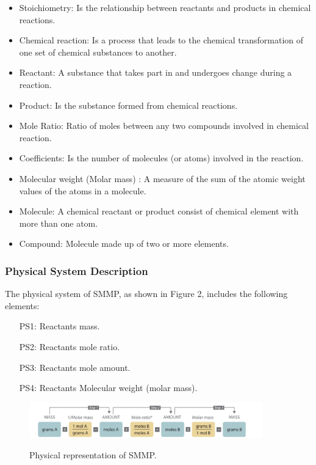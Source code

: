 \documentclass[12pt]{article}
\begin{document}
\begin{itemize}

\item Stoichiometry:  Is the relationship between reactants and products in chemical reactions.
\item Chemical reaction: Is a process that leads to the chemical transformation of one set of chemical substances to another.
\item Reactant: A substance that takes part in and undergoes change during a reaction.
\item Product:  Is the substance formed from chemical reactions.
\item Mole Ratio: Ratio of moles between any two compounds involved in chemical reaction.
\item Coefficients: Is the number of molecules (or atoms) involved in the reaction.
\item Molecular weight (Molar mass) :  A measure of the sum of the atomic weight values of the atoms in a molecule. 
\item Molecule: A chemical reactant or product consist of chemical element with more than one atom.
\item Compound: Molecule made up of two or more elements.
\end{itemize}

\subsubsection{Physical System Description} \label{sec_phySystDescrip}

The physical system of SMMP, as shown in Figure 2,
includes the following elements:

\begin{itemize}

\item[PS1:] Reactants mass.\\
\item[PS2:] Reactants mole ratio.\\
\item[PS3:] Reactants mole amount.\\
\item[PS4:] Reactants Molecular weight (molar mass).\\

\end{itemize}

 \begin{figure}[h!]
 \begin{center}
 {
  \includegraphics[width=0.9\textwidth]{physical}
 }
 \caption{\label{ Figure 2:} Physical representation of SMMP.}
 \end{center}
 \end{figure}
\end{document}
